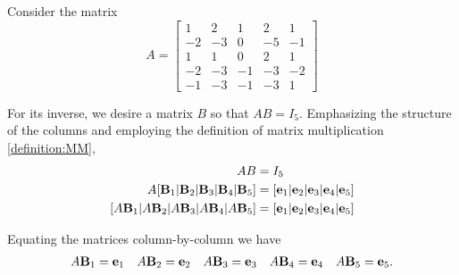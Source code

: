 \documentclass{ximera}
\begin{document}
\begin{example}

Consider the matrix
\[
A=
\begin{bmatrix}
 1 & 2 & 1 & 2 & 1 \\
 -2 & -3 & 0 & -5 & -1 \\
 1 & 1 & 0 & 2 & 1 \\
 -2 & -3 & -1 & -3 & -2 \\
 -1 & -3 & -1 & -3 & 1
\end{bmatrix}
\]

For its inverse, we desire a matrix $B$ so that $AB=I_5$.  Emphasizing the structure of the columns and employing the definition of matrix multiplication \ref{definition:MM},
\begin{align*}    
AB&=I_5\\
A\lbrack \mathbf{B}_1|\mathbf{B}_2|\mathbf{B}_3|\mathbf{B}_4|\mathbf{B}_5]&=[\mathbf{e}_1|\mathbf{e}_2|\mathbf{e}_3|\mathbf{e}_4|\mathbf{e}_5\rbrack\\
\lbrack A\mathbf{B}_1|A\mathbf{B}_2|A\mathbf{B}_3|A\mathbf{B}_4|A\mathbf{B}_5]&=[\mathbf{e}_1|\mathbf{e}_2|\mathbf{e}_3|\mathbf{e}_4|\mathbf{e}_5\rbrack
\end{align*}

Equating the matrices column-by-column we have
\begin{align*}
A\mathbf{B}_1=\mathbf{e}_1&&
A\mathbf{B}_2=\mathbf{e}_2&&
A\mathbf{B}_3=\mathbf{e}_3&&
A\mathbf{B}_4=\mathbf{e}_4&&
A\mathbf{B}_5=\mathbf{e}_5.
\end{align*}



\end{example}
\end{document}
